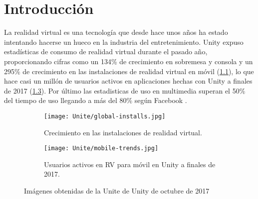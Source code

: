








\pagestyle{empty}
\chapter{Introducción}
La realidad virtual es una tecnología que desde hace unos años ha estado intentando hacerse un hueco en la industria del entretenimiento. Unity expuso estadísticas de consumo de realidad virtual durante el pasado año, proporcionando cifras como un 134\% de crecimiento en sobremesa y consola y un 295\% de crecimiento en las instalaciones de realidad virtual en móvil (\ref{fig:global-installs}), lo que hace casi un millón de usuarios activos en aplicaciones hechas con Unity a finales de 2017 (\ref{fig:mobile-trends}). Por último las estadisticas de uso en multimedia superan el 50\% del tiempo de uso llegando a más del 80\% según Facebook \cite{FBOculusGo}.

\begin{figure}[h]
\centering
\begin{subfigure}{.45\linewidth}
	\centering
	\texttt{[image: Unite/global-installs.jpg]}
  \caption{Crecimiento en las instalaciones de realidad virtual.}
  \label{fig:global-installs}
\end{subfigure}%
\hspace{.05\linewidth}
\begin{subfigure}{.49\linewidth}
	\centering
	\texttt{[image: Unite/mobile-trends.jpg]}
  \caption{Usuarios activos en RV para móvil en Unity a finales de 2017.}
  \label{fig:mobile-trends}
\end{subfigure}
\caption{Imágenes obtenidas de la Unite de Unity de octubre de 2017}
\end{figure}


